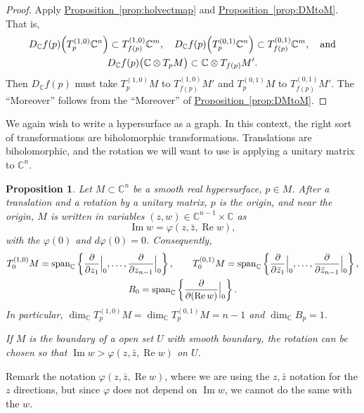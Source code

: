 \documentclass[12pt,openany]{book}
\newcommand{\avoidbreak}{\postdisplaypenalty=100}
\renewcommand{\Re}{\operatorname{Re}}
\renewcommand{\Im}{\operatorname{Im}}
\newcommand{\C}{{\mathbb{C}}}
\theoremstyle{plain}
\newtheorem{prop}[thm]{Proposition}
\theoremstyle{remark}
\theoremstyle{definition}
\theoremstyle{exercise}
\theoremstyle{example}
\newcommand{\propref}[1]{\hyperref[#1]{Proposition~\ref*{#1}}}
\begin{document}
\begin{proof}
Apply \propref{prop:holvectmap} and
\propref{prop:DMtoM}.
That is,
\begin{multline*}
D_\C f(p)\Bigl(T_p^{(1,0)}\C^n\Bigr) \subset T_{f(p)}^{(1,0)}\C^m, \quad
D_\C f(p)\Bigl(T_p^{(0,1)}\C^n\Bigr) \subset T_{f(p)}^{(0,1)}\C^m, \quad
\text{and} \\
D_\C f(p)\bigl(\C \otimes T_pM\bigr) \subset \C \otimes  T_{f(p)}M' .
\avoidbreak
\end{multline*}
Then $D_\C f(p)$ must take
$T_p^{(1,0)}M$ to $T_{f(p)}^{(1,0)}M'$ and
$T_p^{(0,1)}M$ to $T_{f(p)}^{(0,1)}M'$.
The ``Moreover'' follows
from the ``Moreover'' of \propref{prop:DMtoM}.
\end{proof}

We again wish to write a hypersurface as a graph.  In this context, the
right sort of transformations are biholomorphic transformations.
Translations are biholomorphic, and 
the rotation we will want to use is applying a unitary matrix to $\C^n$.

\begin{prop} \label{prop:graphcoordinatesCn}
\pagebreak[2]
Let $M \subset \C^n$ be a smooth real hypersurface, $p \in M$.
After a translation and a rotation by a unitary
matrix, $p$ is the origin, and near the origin,
$M$ is written in variables $(z,w) \in \C^{n-1}
\times \C$ as
\begin{equation*}
\Im w = \varphi(z,\bar{z},\Re w) ,
\end{equation*}
with the $\varphi(0)$  and $d\varphi(0) = 0$.  Consequently,
\begin{gather*}
T_0^{(1,0)} M
= \operatorname{span}_{\C} \left\{
\frac{\partial}{\partial z_1}\Big|_0,
\ldots,
\frac{\partial}{\partial z_{n-1}}\Big|_0 \right\} ,
\qquad
T_0^{(0,1)} M
= \operatorname{span}_{\C} \left\{
\frac{\partial}{\partial \bar{z}_1}\Big|_0,
\ldots,
\frac{\partial}{\partial \bar{z}_{n-1}}\Big|_0 \right\} ,
\\
B_0 = \operatorname{span}_{\C} \left\{
\frac{\partial}{\partial (\Re w)}\Big|_0 \right\} .
\avoidbreak
\end{gather*}
In particular,
$\dim_\C T_p^{(1,0)} M = \dim_\C T_p^{(0,1)} M = n-1$ and
$\dim_\C B_p = 1$.

\nopagebreak
If $M$ is the boundary of a open set $U$ with smooth boundary,
the rotation can be chosen so that
$\Im w > \varphi(z,\bar{z},\Re w)$ on $U$.
\end{prop}

Remark the notation $\varphi(z,\bar{z},\Re w)$, where we are using the
$z,\bar{z}$ notation for the $z$ directions, but since $\varphi$ does not
depend on $\Im w$, we cannot do the same with the $w$.
\end{document}
